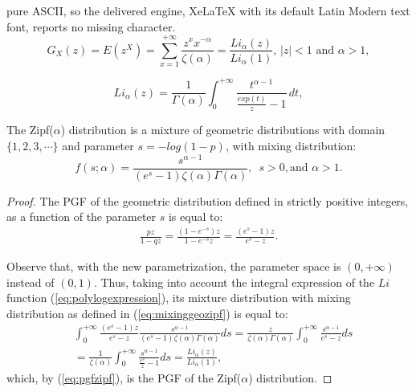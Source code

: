 \documentclass[10pt,a4paper]{amsart}
\begin{document}
pure ASCII, so the delivered engine, XeLaTeX with its default Latin Modern text font, reports no missing character.
\begin{equation} \label{eq:pgfzipf}
G_{X}(z)=E(z^X)=\sum_{x=1}^{+\infty} \frac{z^x x^{-\alpha}}{\zeta(\alpha)}=\frac{Li_{\alpha} (z) }{Li_{\alpha}(1)},\, |z| < 1 \text{ and } \alpha >1,  
\end{equation}

\begin{equation} \label{eq:polylogexpression}
 Li_{\alpha} (z)=\frac{1}{\Gamma (\alpha)} \int_0^{+\infty}   \frac{t^{\alpha-1}}{\frac{exp(t)}{z}-1}\, dt,
\end{equation}

\begin{theorem}
\label{prop:teo-geozipf}
The Zipf($\alpha$) distribution is a mixture of  geometric distributions with domain $\{1,2,3,\cdots\}$ and parameter $s = -log(1-p)$, with mixing distribution:
\begin{equation} \label{eq:mixinggeozipf}
f(s;\alpha)=\frac{s^{\alpha-1}}{(e^{s}-1) \zeta(\alpha) \Gamma(\alpha)},\,\,\,  s>0, \textrm{and}\,\, \alpha>1.
\end{equation}    
\end{theorem}

\begin{proof}
The PGF of the geometric distribution defined in strictly positive integers, as a function of the parameter $s$ is equal to:
\begin{align*}
\frac{pz}{1-qz} = \frac{(1-e^{-s})z}{1-e^{-s}z} = \frac{(e^s -1)z}{e^s -z}.
\end{align*}

Observe that, with the new parametrization, the parameter space is $(0, +\infty)$ instead of $(0, 1)$. Thus, taking into account the integral expression of the $Li$ function (\ref{eq:polylogexpression}), its mixture distribution with mixing distribution as defined in (\ref{eq:mixinggeozipf}) is equal to:
\begin{align}
\label{eq:formula1}
&\int_0^{+\infty} \frac{(e^{s}-1) z}{e^{s}-z} \frac{s^{\alpha-1}}{(e^{s}-1) \zeta(\alpha) \Gamma(\alpha)} ds =  \frac{z}{\zeta(\alpha) \Gamma(\alpha)} \int_0^{+\infty} \frac{s^{\alpha-1}}{e^{s}-z}ds \nonumber \\[5 pt]
&= \frac{1}{\zeta(\alpha)} \int_0^{+\infty} \frac{s^{\alpha - 1}}{\frac{e^{s}}{z} -1}ds
= \frac{Li_{\alpha} (z)}{Li_{\alpha}(1)}, 
\end{align}
\noindent which, by  (\ref{eq:pgfzipf}), is the PGF of the Zipf($\alpha$) distribution.
\end{proof}
\end{document}
